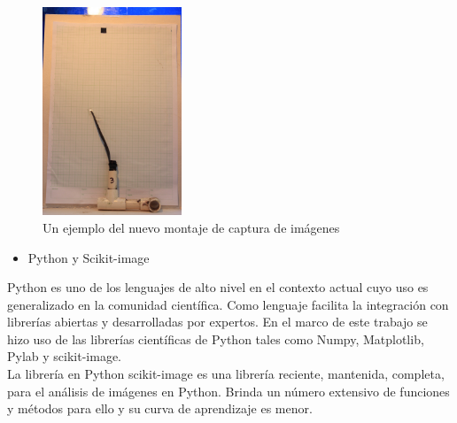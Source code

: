 \documentclass[journal]{IEEEtran}
\begin{document}
\begin{figure}[ht]
\begin{center}
\includegraphics[width=0.37\textwidth]{fotos/Coral_3_S3} %
\caption{Un ejemplo del nuevo montaje de captura de imágenes}
\label{fg:ejemplo_foto}
\end{center}
\end{figure}
\FloatBarrier

\begin{itemize}
    \item Python y Scikit-image
\end{itemize}
\begin{par}
Python es uno de los lenguajes de alto nivel en el contexto actual cuyo
uso es generalizado en la comunidad científica. Como lenguaje facilita la
integración con librerías abiertas y desarrolladas por expertos. En el
marco de este trabajo se hizo uso de las librerías científicas de Python
tales como Numpy, Matplotlib, Pylab y scikit-image.\\
La librería en Python scikit-image \cite{scikit-image} es una librería reciente, mantenida, completa, para el análisis de imágenes en Python. Brinda un número extensivo de funciones y métodos para ello y su curva de aprendizaje es menor.
\end{par}
\end{document}

